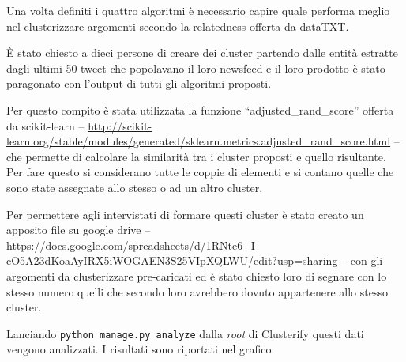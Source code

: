 Una volta definiti i quattro algoritmi è necessario capire quale performa meglio nel clusterizzare argomenti secondo la relatedness offerta da dataTXT.

È stato chiesto a dieci persone di creare dei cluster partendo dalle entità estratte dagli ultimi 50 tweet che popolavano il loro newsfeed e il loro prodotto è stato paragonato con l'output di tutti gli algoritmi proposti. 

Per questo compito è stata utilizzata la funzione ``adjusted\_rand\_score'' offerta da scikit-learn -- \url{http://scikit-learn.org/stable/modules/generated/sklearn.metrics.adjusted_rand_score.html} -- che permette di calcolare la similarità tra i cluster proposti e quello risultante. Per fare questo si considerano tutte le coppie di elementi e si contano quelle che sono state assegnate allo stesso o ad un altro cluster.

Per permettere agli intervistati di formare questi cluster è stato creato un apposito file su google drive -- \url{https://docs.google.com/spreadsheets/d/1RNte6_I-cO5A23dKoaAyIRX5iWOGAEN3S25VIpXQLWU/edit?usp=sharing} -- con gli argomenti da clusterizzare pre-caricati ed è stato chiesto loro di segnare con lo stesso numero quelli che secondo loro avrebbero dovuto appartenere allo stesso cluster. 

Lanciando \texttt{python manage.py analyze} dalla \emph{root} di Clusterify questi dati vengono analizzati. I risultati sono riportati nel grafico:

